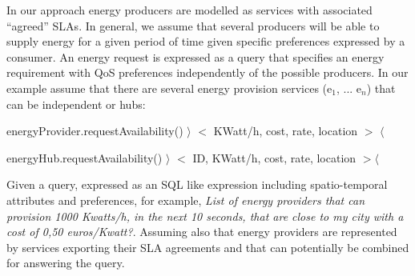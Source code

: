In our approach energy producers are modelled as services with associated ``agreed'' SLAs. 
In general, we assume that several producers will be able to supply energy for a given period of time given specific  preferences expressed by a consumer. 
An energy request is expressed as a query that specifies an energy requirement with QoS preferences independently of the possible producers. In our example assume that there are several energy provision services (e$_1$, ... e$_n$) that can be independent or hubs:
\begin{description}
\item energyProvider.requestAvailability() $\rangle$ $<$ KWatt/h, cost, rate, location $>$ $\langle$

\item energyHub.requestAvailability() $\rangle$ $<$ {ID, KWatt/h, cost, rate, location $>$}$\langle$
\end{description}

 Given a query, expressed as an SQL like expression including spatio-temporal attributes and preferences, for example, {\em List of energy providers that can provision 1000 Kwatts/h, in the next 10 seconds, that are close to my city with a cost of 0,50 euros/Kwatt?}. Assuming also that energy providers are represented by services exporting their SLA agreements and that can potentially be combined for answering the query. 